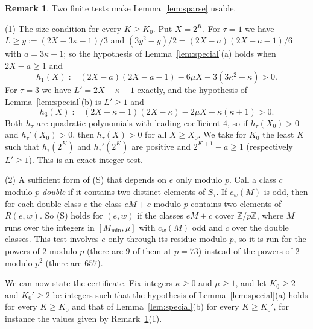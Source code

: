 \documentclass[12pt]{amsart}
\theoremstyle{definition}
\newtheorem{remark}[theorem]{Remark}
\newcommand{\Z}{\mathbb{Z}}
\newcommand{\lean}[1]{\ignorespaces}
\newcommand{\computed}[2]{\ignorespaces}
\begin{document}
\begin{remark}\label{rem:check}
\lean{\decl{KeithZanello.condS1} and \decl{KeithZanello.condS3}, which check condition (S) by the test of part (2) at $p=73$; part (1) has no counterpart, since \decl{KeithZanello.special_pent} and \decl{KeithZanello.special_tri} are proved for $K\ge13$ and $K\ge11$ directly}
\computed{gp -q paper/small_checks.gp, part 6}{paper/small_checks.out}
Two finite tests make Lemma~\ref{lem:sparse} usable.

(1) The size condition for every $K\ge K_0$. Put $X=2^K$. For $\tau=1$ we have $L\ge y:=(2X-3\kappa-1)/3$ and $(3y^2-y)/2=(2X-a)(2X-a-1)/6$ with $a=3\kappa+1$; so the hypothesis of Lemma~\ref{lem:special}(a) holds when $2X-a\ge1$ and
\[
h_1(X):=(2X-a)(2X-a-1)-6\mu X-3(3\kappa^2+\kappa)>0 .
\]
For $\tau=3$ we have $L'=2X-\kappa-1$ exactly, and the hypothesis of Lemma~\ref{lem:special}(b) is $L'\ge1$ and
\[
h_3(X):=(2X-\kappa-1)(2X-\kappa)-2\mu X-\kappa(\kappa+1)>0 .
\]
Both $h_\tau$ are quadratic polynomials with leading coefficient $4$, so if $h_\tau(X_0)>0$ and $h_\tau'(X_0)>0$, then $h_\tau(X)>0$ for all $X\ge X_0$. We take for $K_0$ the least $K$ such that $h_\tau(2^K)$ and $h_\tau'(2^K)$ are positive and $2^{K+1}-a\ge1$ (respectively $L'\ge1$). This is an exact integer test.

(2) A sufficient form of (S) that depends on $e$ only modulo $p$. Call a class $c$ modulo $p$ \emph{double} if it contains two distinct elements of $S_\tau$. If $c_w(M)$ is odd, then for each double class $c$ the class $eM+c$ modulo $p$ contains two elements of $R(e,w)$. So (S) holds for $(e,w)$ if the classes $eM+c$ cover $\Z/p\Z$, where $M$ runs over the integers in $[M_{\min},\mu]$ with $c_w(M)$ odd and $c$ over the double classes. This test involves $e$ only through its residue modulo $p$, so it is run for the powers of $2$ modulo $p$ (there are $9$ of them at $p=73$) instead of the powers of $2$ modulo $p^2$ (there are $657$).
\end{remark}

We can now state the certificate. Fix integers $\kappa\ge0$ and $\mu\ge1$, and let $K_0\ge2$ and $K_0'\ge2$ be integers such that the hypothesis of Lemma~\ref{lem:special}(a) holds for every $K\ge K_0$ and that of Lemma~\ref{lem:special}(b) for every $K\ge K_0'$, for instance the values given by Remark~\ref{rem:check}(1).
\end{document}
